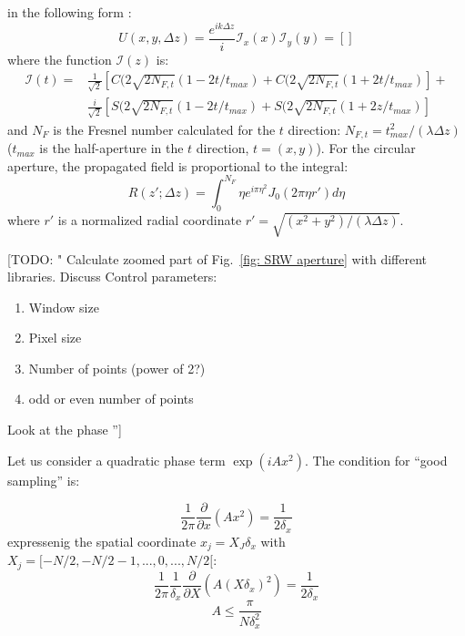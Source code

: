 \documentclass{iucr}              %
\newcommand{\todo}[1]{{\color{red}[TODO: "#1'']}}
\begin{document}
in the following form \cite{goodmanfourier}:
\begin{equation}\label{eq: analytical rectangular slit}
U(x, y, \Delta z)= \frac{e^{i k \Delta z}}{i} \mathcal{I}_x(x) \mathcal{I}_y(y) = \left[ \right] 
\end{equation}
where the function $\mathcal{I}(z)$ is: 
\begin{align}\label{eq: analytical rectangular slit}
\mathcal{I}(t) = & \frac{1}{\sqrt 2}[ C(2 \sqrt{2 N_{F,t}} (1 - 2 t /t_{max}) + C(2 \sqrt{2 N_{F,t}} (1 + 2 t /t_{max})] +\\
		 & \frac{i}{\sqrt 2}[ S(2 \sqrt{2 N_{F,t}} (1 - 2 t /t_{max}) + S(2 \sqrt{2 N_{F,t}} (1 + 2 z /t_{max})]
\end{align}
and $N_F$ is the Fresnel number calculated for the $t$ direction: $N_{F,t} = t_{max}^2 / (\lambda \Delta z)$ ($t_{max}$ is the half-aperture in the $t$ direction, $t=(x,y)$).
For the circular aperture, the propagated field is proportional to the integral:
\begin{equation}\label{eq: analytical rectangular slit}
R(z'; \Delta z) = \int_0^{N_F} \eta e^{i \pi \eta^2} J_0(2 \pi \eta r') d\eta 
\end{equation}
where $r'$ is a normalized radial coordinate $r' = \sqrt{(x^2 + y^2)/(\lambda \Delta z)}$.


\todo{ Calculate zoomed part of Fig.~\ref{fig: SRW aperture} with different libraries. 
Discuss Control parameters: 
\begin{enumerate}
\item Window size
\item Pixel size
\item Number of points (power of 2?)
\item odd or even number of points
\end{enumerate}
Look at the phase 
}


Let us consider a quadratic phase term $\exp(i A x^2)$. The condition for ``good sampling'' is:

\begin{equation}\label{eq: xxx1}
\frac{1}{2 \pi} \frac{\partial}{\partial x}(A x^2) = \frac{1}{2 \delta_x}
\end{equation}
expressenig the spatial coordinate $x_j=X_J \delta_x$ with $X_j = [-N/2,-N/2 -1, ..., 0,..., N/2[$:
\begin{equation}\label{eq: xxx2}
\frac{1}{2 \pi} \frac{1}{\delta_x} \frac{\partial}{\partial X}(A (X \delta_x)^2) = \frac{1}{2 \delta_x}
\end{equation}
\begin{equation}\label{eq:xxx3}
A \leq \frac{\pi}{N \delta_x^2}
\end{equation}
\end{document}
